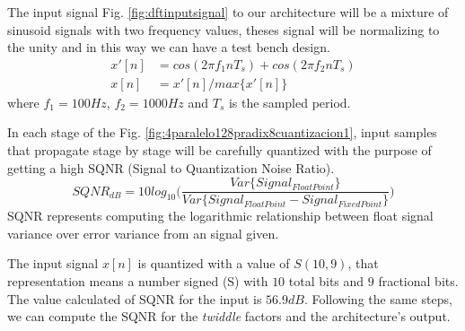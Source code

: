 \documentclass[journal,comsoc]{IEEEtran}
\begin{document}
The input signal Fig. \ref{fig:dftinputsignal} to our architecture will be a mixture of sinusoid signals with two frequency values, theses signal will be normalizing to the unity and in this way we can have a test bench design.
\begin{align}\label{eq: inputSignal}
x'[n] &= cos(2\pi f_1 n T_s) + cos(2\pi f_2 n T_s)  \\
x[n] &= x'[n]/max\{x'[n]\} 						\nonumber
\end{align}
where $f_1=100Hz$, $f_2=1000Hz$ and $T_s$ is the sampled period.

In each stage of the Fig. \ref{fig:4paralelo128pradix8cuantizacion1}, input samples that propagate stage by stage will be carefully quantized with the purpose of getting a high SQNR (Signal to Quantization Noise Ratio).
\begin{equation*}%
SQNR_{dB} = 10log_{10} \bigg(  \frac{  Var\{Signal_{FloatPoint}\}  }{  Var\{Signal_{FloatPoint} - Signal_{FixedPoint}\}}  \bigg)
\end{equation*}
SQNR represents computing the logarithmic relationship between float signal variance over error variance from an signal given.

The input signal $x[n]$ is quantized with a value of $S(10,9)$, that representation means a number signed (S) with $10$ total bits and $9$ fractional bits. The value calculated of SQNR for the input is $56.9dB$. Following the same steps, we can compute the SQNR for the \textit{twiddle} factors and the architecture's output.
\end{document}
